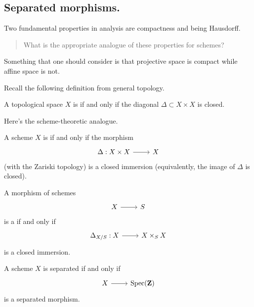 \documentclass [11 pt, oneside] {article}
\begin{document}
\subsection{Separated morphisms.}
Two fundamental properties in analysis are compactness and being Hausdorff. 
\begin{quote}
	\small What is the appropriate analogue of these properties for schemes?
\end{quote}
Something that one should consider is that projective space is compact while affine space is not.

Recall the following definition from general topology.

 \begin{definition}[ ]\label{}\text{}
A topological space $X$ is  if and only if the diagonal $\Delta\subset X\times X$ is closed.
\end{definition}

Here's the scheme-theoretic analogue.

\begin{definition}[ ]\label{}\text{}
A scheme $X$ is  if and only if the morphism 
\[
\begin{tikzcd}
\Delta: X\times X\ar[r]& X
\end{tikzcd}
\] 
(with the Zariski topology) is a closed immersion (equivalently, the image of $\Delta$ is closed).
\end{definition}

 \begin{definition}[ ]\label{}\text{}
A morphism of schemes
\[
\begin{tikzcd}
X\ar[r]& S
\end{tikzcd}
\] 
is a  if and only if 
\[
\begin{tikzcd}
\Delta_{X/S} : X\ar[r]& X\times_S X
\end{tikzcd}
\] 
is a closed immersion.
\end{definition}

\begin{remark}
	A scheme $X$ is separated if and only if
	\[
\begin{tikzcd}
X\ar[r]& \Spec(\Z)
\end{tikzcd}
\] 
is a separated morphism. 
\end{remark}
\end{document}
